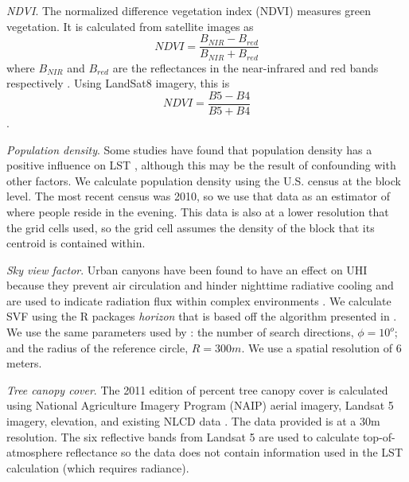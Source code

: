 \documentclass[review]{elsarticle}
\begin{document}
\textit{NDVI}. 
The normalized difference vegetation index (NDVI) measures green vegetation. 
It is calculated from satellite images as $$NDVI=\frac{B_{NIR}-B_{red}}{B_{NIR}+B_{red}}$$ where $B_{NIR}$ and $B_{red}$ are the reflectances in the near-infrared and red bands respectively \cite{Alhawiti2016-wv}. 
Using LandSat8 imagery, this is $$NDVI=\frac{B5-B4}{B5+B4}$$ \cite{barsi2014}.


\textit{Population density}. 
Some studies have found that population density has a positive influence on LST \cite{Li2017-yl, Peng2018-cp}, although this may be the result of confounding with other factors. 
We calculate population density using the U.S. census at the block level. 
The most recent census was 2010, so we use that data as an estimator of where people reside in the evening. 
This data is also at a lower resolution that the grid cells used, so the grid cell assumes the density of the block that its centroid is contained within.

\textit{Sky view factor}. Urban canyons have been found to have an effect on UHI because they prevent air circulation and hinder nighttime radiative cooling \cite{Landsberg1981-mq, Chun2017-mm} and are used to indicate radiation flux within complex environments \cite{Matzarakis2007-xy}. We calculate SVF using the R packages \textit{horizon} \cite{Van_doninck2018-ib} that is based off the algorithm presented in \cite{Dozier1990-kn}. 
We use the same parameters used by \cite{Chun2017-mm}: the number of search directions, $\phi=10^o$; and the radius of the reference circle, $R=300m$. 
We use a spatial resolution of 6 meters.

\textit{Tree canopy cover}. 
The 2011 edition of percent tree canopy cover is calculated using National Agriculture Imagery Program (NAIP) aerial imagery, Landsat 5 imagery, elevation, and existing NLCD data \cite{Coulston2012-uu, Homer2015-ce}. 
The data provided is at a 30m resolution. 
The six reflective bands from Landsat 5 are used to calculate top-of-atmosphere reflectance \cite{Coulston2012-uu} so the data does not contain information used in the LST calculation (which requires radiance). 
\end{document}
